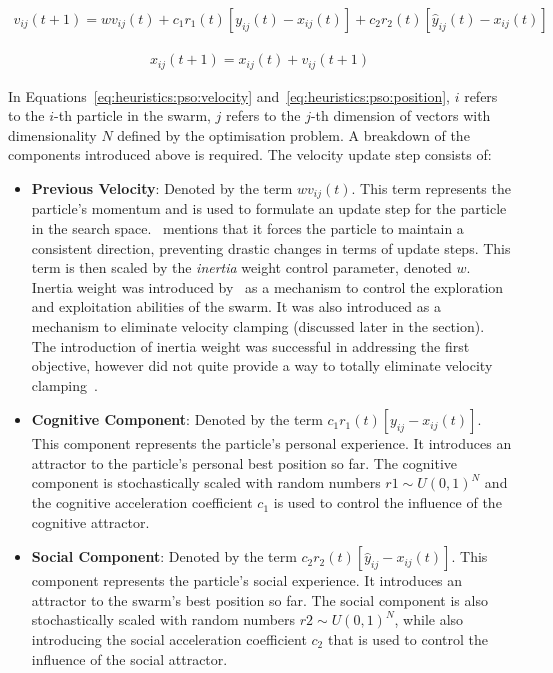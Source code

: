 \begin{equation}
      \label{eq:heuristics:pso:velocity}
      \begin{split}
            v_{ij}(t+1) = wv_{ij}(t) + c_{1}r_{1}(t)[y_{ij}(t) - x_{ij}(t)] + c_{2}r_{2}(t)[\hat{y}_{ij}(t) - x_{ij}(t)]
      \end{split}
\end{equation}

\begin{equation}
      \label{eq:heuristics:pso:position}
      \begin{split}
            x_{ij}(t+1) = x_{ij}(t) + v_{ij}(t+1)
      \end{split}
\end{equation}

In Equations~\ref{eq:heuristics:pso:velocity} and~\ref{eq:heuristics:pso:position}, $i$ refers to the $i$-th particle in the swarm, $j$ refers to the $j$-th dimension of vectors with dimensionality $N$ defined by the optimisation problem. A breakdown of the components introduced above is required. The velocity update step consists of:

\begin{itemize}
      \item \textbf{Previous Velocity}: Denoted by the term $wv_{ij}(t)$. This term represents the particle's momentum and is used to formulate an update step for the particle in the search space.~\citeauthor{ref:vanwyk:2014}\cite{ref:vanwyk:2014} mentions that it forces the particle to maintain a consistent direction, preventing drastic changes in terms of update steps. This term is then scaled by the \textit{inertia} weight control parameter, denoted $w$. Inertia weight was introduced by~\citeauthor{ref:shi:1998}\cite{ref:shi:1998} as a mechanism to control the exploration and exploitation abilities of the swarm. It was also introduced as a mechanism to eliminate velocity clamping (discussed later in the section). The introduction of inertia weight was successful in addressing the first objective, however did not quite provide a way to totally eliminate velocity clamping~\cite{ref:shi:2001}.

      \item \textbf{Cognitive Component}: Denoted by the term $c_{1}r_{1}(t)[y_{ij} - x_{ij}(t)]$. This component represents the particle's personal  experience. It introduces an attractor to the particle's personal best position so far. The cognitive component is stochastically scaled with random numbers $r{1} \sim U(0,1)^N$ and the cognitive acceleration coefficient $c_{1}$ is used to control the influence of the cognitive attractor.

      \item \textbf{Social Component}: Denoted by the term $c_{2}r_{2}(t)[\hat{y}_{ij} - x_{ij}(t)]$. This component represents the particle's social  experience. It introduces an attractor to the swarm's best position so far. The social component is also stochastically scaled with random numbers $r{2} \sim U(0,1)^N$, while also introducing the social acceleration coefficient $c_{2}$ that is used to control the influence of the social attractor.
\end{itemize}

